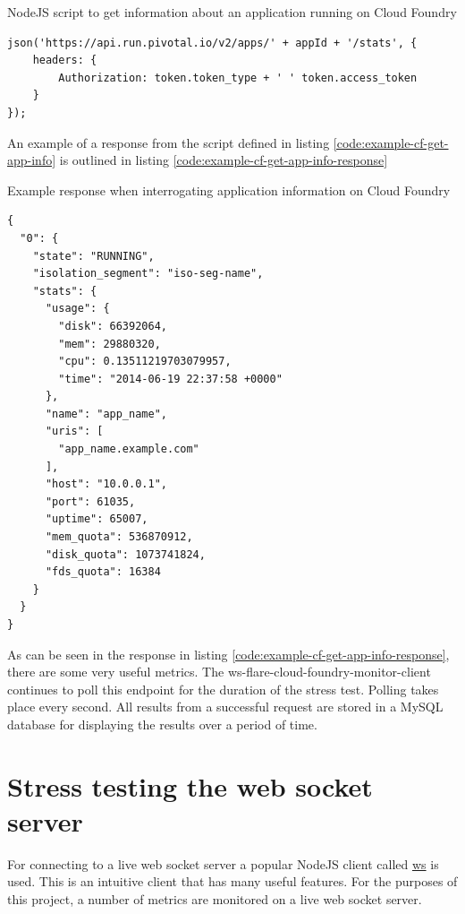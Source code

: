 \begin{listing}[H]
    \caption{NodeJS script to get information about an application running on Cloud Foundry}
    \label{code:example-cf-get-app-info}
\begin{verbatim}
json('https://api.run.pivotal.io/v2/apps/' + appId + '/stats', {
    headers: {
        Authorization: token.token_type + ' ' token.access_token
    }
});
\end{verbatim}
\end{listing}

An example of a response from the script defined in listing \ref{code:example-cf-get-app-info} is outlined in listing \ref{code:example-cf-get-app-info-response}

\begin{listing}[H]
    \caption{Example response when interrogating application information on Cloud Foundry}
    \label{code:example-cf-get-app-info-response}
\begin{verbatim}
{
  "0": {
    "state": "RUNNING",
    "isolation_segment": "iso-seg-name",
    "stats": {
      "usage": {
        "disk": 66392064,
        "mem": 29880320,
        "cpu": 0.13511219703079957,
        "time": "2014-06-19 22:37:58 +0000"
      },
      "name": "app_name",
      "uris": [
        "app_name.example.com"
      ],
      "host": "10.0.0.1",
      "port": 61035,
      "uptime": 65007,
      "mem_quota": 536870912,
      "disk_quota": 1073741824,
      "fds_quota": 16384
    }
  }
}
\end{verbatim}
\end{listing}

As can be seen in the response in listing \ref{code:example-cf-get-app-info-response}, there are some very useful metrics. The ws-flare-cloud-foundry-monitor-client continues to poll this endpoint for the duration of the stress test. Polling takes place every second. All results from a successful request are stored in a MySQL database for displaying the results over a period of time.

\section{Stress testing the web socket server}

For connecting to a live web socket server a popular NodeJS client called \href{https://www.npmjs.com/package/ws}{ws} is used. This is an intuitive client that has many useful features. For the purposes of this project, a number of metrics are monitored on a live web socket server.

